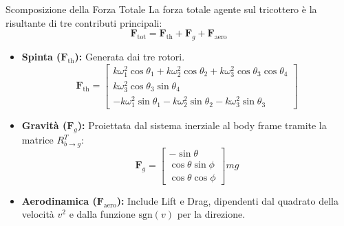 \documentclass[aspectratio=169]{beamer} %
\begin{document}
\begin{frame}{Scomposizione della Forza Totale}
    La forza totale agente sul tricottero è la risultante di tre contributi principali:
    \begin{equation}
        \bm{F}_{\text{tot}} = \bm{F}_{\text{th}} + \bm{F}_g + \bm{F}_{\text{aero}}
    \end{equation}

    \begin{itemize}
        \item \textbf{Spinta ($\bm{F}_{\text{th}}$):} Generata dai tre rotori.
        \begin{equation}
            \bm{F}_{\text{th}} = 
            \begin{bmatrix}
                k\omega_1^2 \cos\theta_1 + k\omega_2^2 \cos\theta_2 + k\omega_3^2 \cos\theta_3 \cos\theta_4 \\
                k\omega_3^2 \cos\theta_3 \sin\theta_4 \\
                -k\omega_1^2 \sin\theta_1 - k\omega_2^2 \sin\theta_2 - k\omega_3^2 \sin\theta_3
            \end{bmatrix}
        \end{equation}
        \item \textbf{Gravità ($\bm{F}_g$):} Proiettata dal sistema inerziale al body frame tramite la matrice $R_{b \to g}^T$:
        \begin{equation}
            \bm{F}_g = \begin{bmatrix} -\sin\theta \\ \cos\theta \sin\phi \\ \cos\theta \cos\phi \end{bmatrix} mg
        \end{equation}
        \item \textbf{Aerodinamica ($\bm{F}_{\text{aero}}$):} Include Lift e Drag, dipendenti dal quadrato della velocità $v^2$ e dalla funzione $\text{sgn}(v)$ per la direzione.
    \end{itemize}
\end{frame}
\end{document}
